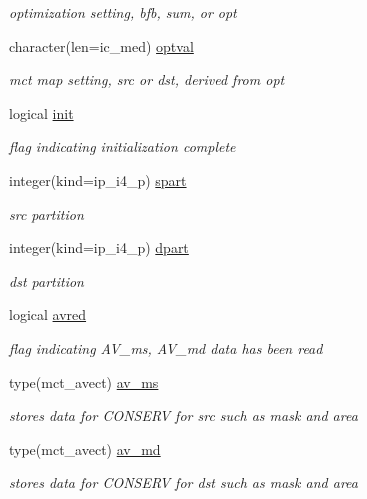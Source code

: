 \begin{DoxyCompactItemize}
\begin{DoxyCompactList}\small\item\em optimization setting, bfb, sum, or opt \end{DoxyCompactList}\item 
character(len=ic\+\_\+med) \hyperlink{structmod__oasis__coupler_1_1prism__mapper__type_a14428f8875578a854dd33afbbfaabe57}{optval}
\begin{DoxyCompactList}\small\item\em mct map setting, src or dst, derived from opt \end{DoxyCompactList}\item 
logical \hyperlink{structmod__oasis__coupler_1_1prism__mapper__type_aa558dfa65125e50c062b519b68d89ba1}{init}
\begin{DoxyCompactList}\small\item\em flag indicating initialization complete \end{DoxyCompactList}\item 
integer(kind=ip\+\_\+i4\+\_\+p) \hyperlink{structmod__oasis__coupler_1_1prism__mapper__type_a57db47c76982ed2bfae82ccc0cf5e350}{spart}
\begin{DoxyCompactList}\small\item\em src partition \end{DoxyCompactList}\item 
integer(kind=ip\+\_\+i4\+\_\+p) \hyperlink{structmod__oasis__coupler_1_1prism__mapper__type_a51bdf1e868cc738ca424cf533266240e}{dpart}
\begin{DoxyCompactList}\small\item\em dst partition \end{DoxyCompactList}\item 
logical \hyperlink{structmod__oasis__coupler_1_1prism__mapper__type_a43703d30f4439aeab0b9e3fc7e588486}{avred}
\begin{DoxyCompactList}\small\item\em flag indicating A\+V\+\_\+ms, A\+V\+\_\+md data has been read \end{DoxyCompactList}\item 
type(mct\+\_\+avect) \hyperlink{structmod__oasis__coupler_1_1prism__mapper__type_af33fa10111ae337fcc0c016d7c58e0a1}{av\+\_\+ms}
\begin{DoxyCompactList}\small\item\em stores data for C\+O\+N\+S\+E\+R\+V for src such as mask and area \end{DoxyCompactList}\item 
type(mct\+\_\+avect) \hyperlink{structmod__oasis__coupler_1_1prism__mapper__type_a38134488707455521a0455c537b7b5e1}{av\+\_\+md}
\begin{DoxyCompactList}\small\item\em stores data for C\+O\+N\+S\+E\+R\+V for dst such as mask and area \end{DoxyCompactList}\end{DoxyCompactItemize}


